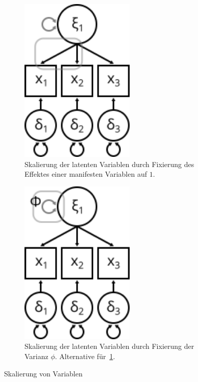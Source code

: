 \documentclass{article}
\numberwithin{equation}{section}
\begin{document}
\begin{figure}
\begin{subfigure}[b]{0.32\textwidth}
    \includegraphics[width=0.6\textwidth]{images/sem/skala-latent.png}
    \caption{Skalierung der latenten Variablen durch Fixierung des Effektes einer manifesten Variablen auf $1$.}
    \label{img:skala-latent}
  \end{subfigure}
  \begin{subfigure}[b]{0.32\textwidth}
    \centering
    \includegraphics[width=0.6\textwidth]{images/sem/skala-varianz.png}
    \caption{Skalierung der latenten Variablen durch Fixierung der Varianz $\phi$. Alternative für~\ref{img:skala-latent}.}
    \label{img:skala-varianz}
  \end{subfigure}
  \caption{Skalierung von Variablen}
  \label{img:skala}
\end{figure}
\end{document}
